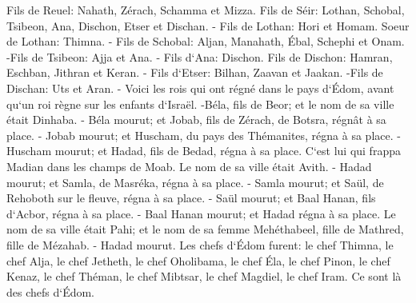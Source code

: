 \verse Fils de Reuel: Nahath, Zérach, Schamma et Mizza. 
\verse Fils de Séir: Lothan, Schobal, Tsibeon, Ana, Dischon, Etser et Dischan. - 
\verse Fils de Lothan: Hori et Homam. Soeur de Lothan: Thimna. - 
\verse Fils de Schobal: Aljan, Manahath, Ébal, Schephi et Onam. -Fils de Tsibeon: Ajja et Ana. - 
\verse Fils d`Ana: Dischon. Fils de Dischon: Hamran, Eschban, Jithran et Keran. - 
\verse Fils d`Etser: Bilhan, Zaavan et Jaakan. -Fils de Dischan: Uts et Aran. - 
\verse Voici les rois qui ont régné dans le pays d`Édom, avant qu`un roi règne sur les enfants d`Israël. -Béla, fils de Beor; et le nom de sa ville était Dinhaba. - 
\verse Béla mourut; et Jobab, fils de Zérach, de Botsra, régnât à sa place. - 
\verse Jobab mourut; et Huscham, du pays des Thémanites, régna à sa place. - 
\verse Huscham mourut; et Hadad, fils de Bedad, régna à sa place. C`est lui qui frappa Madian dans les champs de Moab. Le nom de sa ville était Avith. - 
\verse Hadad mourut; et Samla, de Masréka, régna à sa place. - 
\verse Samla mourut; et Saül, de Rehoboth sur le fleuve, régna à sa place. - 
\verse Saül mourut; et Baal Hanan, fils d`Acbor, régna à sa place. - 
\verse Baal Hanan mourut; et Hadad régna à sa place. Le nom de sa ville était Pahi; et le nom de sa femme Mehéthabeel, fille de Mathred, fille de Mézahab. - 
\verse Hadad mourut. Les chefs d`Édom furent: le chef Thimna, le chef Alja, le chef Jetheth, 
\verse le chef Oholibama, le chef Éla, le chef Pinon, 
\verse le chef Kenaz, le chef Théman, le chef Mibtsar, 
\verse le chef Magdiel, le chef Iram. Ce sont là des chefs d`Édom. 

\chapter{}

